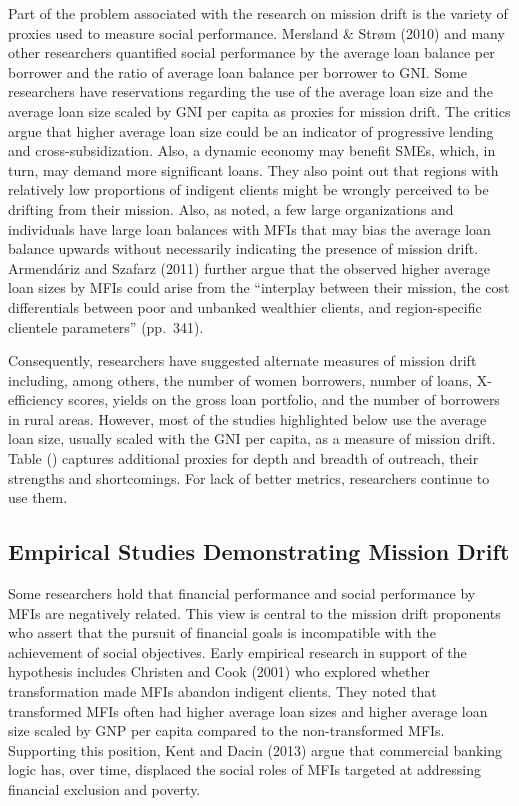 \documentclass[a4paper, nobind]{templates/ociamthesis}
\begin{document}
Part of the problem associated with the research on mission drift is the variety of proxies used to measure social performance. Mersland \& Strøm (2010) and many other researchers quantified social performance by the average loan balance per borrower and the ratio of average loan balance per borrower to GNI. Some researchers have reservations regarding the use of the average loan size and the average loan size scaled by GNI per capita as proxies for mission drift. The critics argue that higher average loan size could be an indicator of progressive lending and cross-subsidization. Also, a dynamic economy may benefit SMEs, which, in turn, may demand more significant loans. They also point out that regions with relatively low proportions of indigent clients might be wrongly perceived to be drifting from their mission. Also, as noted, a few large organizations and individuals have large loan balances with MFIs that may bias the average loan balance upwards without necessarily indicating the presence of mission drift. Armendáriz and Szafarz (2011) further argue that the observed higher average loan sizes by MFIs could arise from the ``interplay between their mission, the cost differentials between poor and unbanked wealthier clients, and region-specific clientele parameters'' (pp.~341).

Consequently, researchers have suggested alternate measures of mission drift including, among others, the number of women borrowers, number of loans, X-efficiency scores, yields on the gross loan portfolio, and the number of borrowers in rural areas. However, most of the studies highlighted below use the average loan size, usually scaled with the GNI per capita, as a measure of mission drift. Table () captures additional proxies for depth and breadth of outreach, their strengths and shortcomings. For lack of better metrics, researchers continue to use them.

\hypertarget{empirical-studies-demonstrating-mission-drift}{%
\subsection{Empirical Studies Demonstrating Mission Drift}\label{empirical-studies-demonstrating-mission-drift}}

\noindent Some researchers hold that financial performance and social performance by MFIs are negatively related. This view is central to the mission drift proponents who assert that the pursuit of financial goals is incompatible with the achievement of social objectives. Early empirical research in support of the hypothesis includes Christen and Cook (2001) who explored whether transformation made MFIs abandon indigent clients. They noted that transformed MFIs often had higher average loan sizes and higher average loan size scaled by GNP per capita compared to the non-transformed MFIs. Supporting this position, Kent and Dacin (2013) argue that commercial banking logic has, over time, displaced the social roles of MFIs targeted at addressing financial exclusion and poverty.
\end{document}
